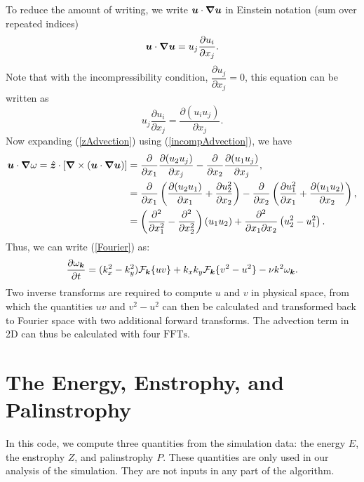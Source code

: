 \documentclass[12pt]{article}
\def\Eq#1{(\ref{#1})}
\begin{document}
To reduce the amount of writing, we write ${\bm u}\cdot\bm\nabla{\bm u}$ in Einstein notation (sum over repeated indices)
$${\bm u}\cdot\bm\nabla{\bm u} =u_j\dfrac{\partial u_i}{\partial x_j}.$$
Note that with the incompressibility condition, $\dfrac{\partial u_j}{\partial x_j} =0$, this equation can be written as 
\begin{equation}\label{incompAdvection}
u_j\dfrac{\partial u_i}{\partial x_j} = \dfrac{\partial (u_iu_j)}{\partial x_j}.
\end{equation}
Now expanding \Eq{zAdvection} using \Eq{incompAdvection}, we have
\begin{align*}
{\bm u}\cdot\bm\nabla\omega =\hat{{\bm z}}\cdot \left[\bm\nabla \times \left({\bm u}\cdot\bm\nabla{\bm u} \right)\right]&= \dfrac{\partial }{\partial x_1}\dfrac{\partial (u_2u_j)}{\partial x_j}  - \dfrac{\partial }{\partial x_2}\dfrac{\partial (u_1u_j)}{\partial x_j},\\
&= \dfrac{\partial }{\partial x_1}\left(\dfrac{\partial (u_2u_1)}{\partial x_1}+\dfrac{\partial u_2^2}{\partial x_2}\right)  - \dfrac{\partial }{\partial x_2}\left(\dfrac{\partial u_1^2}{\partial x_1}+\dfrac{\partial (u_1u_2)}{\partial x_2}\right),\\
&= \left(\frac{\partial^2}{\partial x_1^2} - \frac{\partial^2}{\partial x_2^2}\right)(u_1u_2) +\frac{\partial^2}{\partial x_1\partial x_2}\left(u_2^2-u_1^2\right).\\
\end{align*}
Thus, we can write \Eq{Fourier} as:
\begin{equation}\label{evolutionary}
  \frac{\partial\omega_{{\bm k}}}{\partial t} =
  (k_x^2-k_y^2) {\mathcal F}_{\bm k}\{uv\}+k_xk_y{\mathcal F}_{\bm k}\{v^2-u^2\} -\nu k^2\omega_{{\bm k}}.
\end{equation}
Two inverse transforms are required to compute $u$ and $v$ in physical
space, from which the quantities $uv$ and $v^2-u^2$ can then be
calculated and transformed back to Fourier space with two additional
forward transforms. The advection term in 2D can thus be calculated with four $\text{FFTs}$.
\section{The Energy, Enstrophy, and Palinstrophy} 
In this code, we compute three quantities from the simulation data: the energy $E$, the enstrophy $Z$, and palinstrophy $P$.  These quantities are only used in our analysis of the simulation. They are not inputs in any part of the algorithm. 
\end{document}
